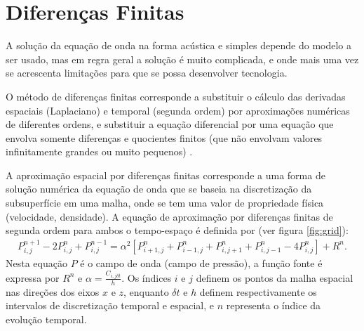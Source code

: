 % 
% 
% 
% 

\section{Diferenças Finitas}

A solução da equação de onda na forma acústica e simples depende do modelo a ser usado, mas em regra geral a solução é muito complicada, e onde mais uma vez se acrescenta limitações para que se possa desenvolver tecnologia.

O método de diferenças finitas corresponde a substituir o cálculo das derivadas espaciais (Laplaciano) e temporal (segunda ordem) por aproximações numéricas de diferentes ordens, e substituir a equação diferencial por uma equação que envolva somente diferenças e quocientes finitos (que não envolvam valores infinitamente grandes ou muito pequenos) \cite{LeVeque(2007)}. 

A aproximação espacial por diferenças finitas corresponde a uma forma de solução numérica da equação de onda que se baseia na discretização da subsuperfície em uma malha, onde se tem uma valor de propriedade física (velocidade, densidade).
A equação de aproximação por diferenças finitas de segunda ordem para ambos o tempo-espaço é definida por (ver figura \ref{fig:grid}):
\begin{eqnarray}
P^{n+1}_{i,j}-2P^{n}_{i,j}+P^{n-1}_{i,j}=\alpha^2[P^{n}_{i+1,j}+P^{n}_{i-1,j}+P^{n}_{i,j+1}+P^{n}_{i,j-1}-4P^{n}_{i,j}]+R^{n}.
\label{eq:approx_finit}
\end{eqnarray}
Nesta equação $P$ é o campo de onda (campo de pressão), a função fonte é expressa por $R^{n}$ e $\alpha=\frac{C_{i,j\delta t}}{h}$. 
Os índices $i$ e $j$ definem os pontos da malha espacial nas direções dos eixos $x$ e $z$, enquanto $\delta t$ e $h$ definem respectivamente os intervalos de discretização temporal e espacial, e $n$ representa o índice da evolução temporal.

